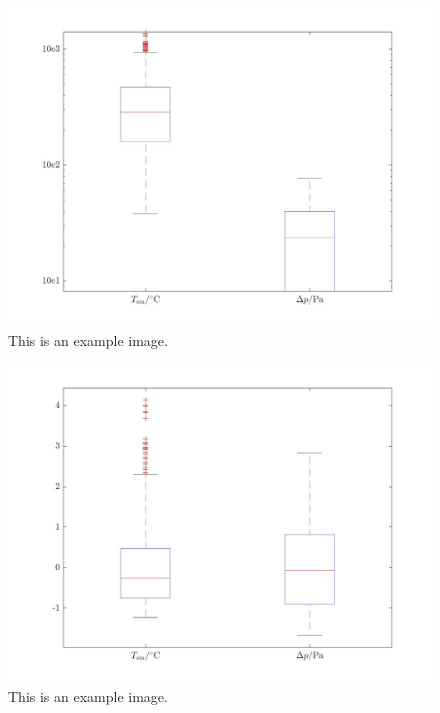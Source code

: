         \begin{figure}[H]
            \centering
            \includegraphics[width=1\textwidth]{00_Images/00_Large_Stack_Images/00_Combined_Boxplot_Outputs_July_10_2024_v1.jpg}  %
            \caption{This is an example image.}
            \label{fig:example1}
        \end{figure}

        \begin{figure}[H]
            \centering
            \includegraphics[width=1\textwidth]{00_Images/00_Large_Stack_Images/00_Combined_Boxplot_Normalized_Outputs_July_10_2024_v1.jpg}  %
            \caption{This is an example image.}
            \label{fig:example1}
        \end{figure}

